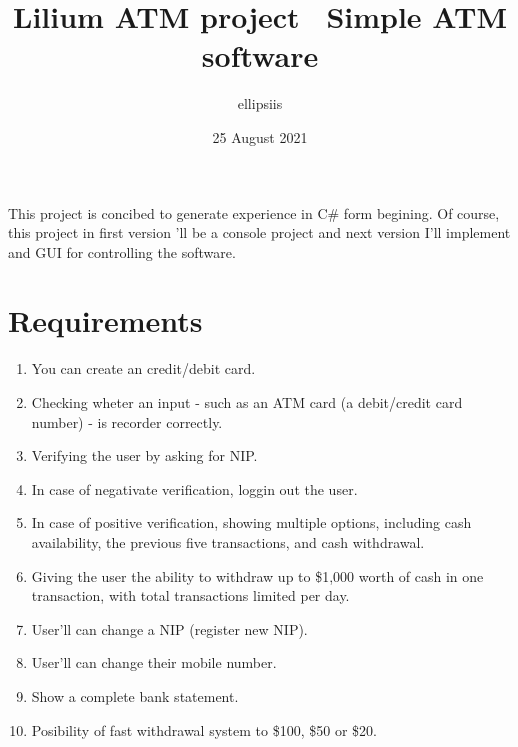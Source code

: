 \documentclass[letterpaper, 12pt]{article}
\title{Lilium ATM project \ Simple ATM software}
\author{\@ ellipsiis}
\date{25 August 2021}
\begin{document}
\maketitle
    This project is concibed to generate experience in C\# form begining. Of course, this project in first version
    'll be a console project and next version I'll implement and GUI for controlling the software.
    \section*{Requirements}
    \begin{enumerate}
        \item You can create an credit/debit card.
        \item Checking wheter an input - such as an ATM card (a debit/credit card number) - is recorder correctly.
        \item Verifying the user by asking for NIP.
        \item In case of negativate verification, loggin out the user.
        \item In case of positive verification, showing multiple options, including cash availability,
        the previous five transactions, and cash withdrawal.
        \item Giving the user the ability to withdraw up to \$1,000 worth of cash in one transaction,
        with total transactions limited per day.
        \item User'll can change a NIP (register new NIP).
        \item User'll can change their mobile number.
        \item Show a complete bank statement.
        \item Posibility of fast withdrawal system to \$100, \$50 or \$20.

    \end{enumerate}
\end{document}
